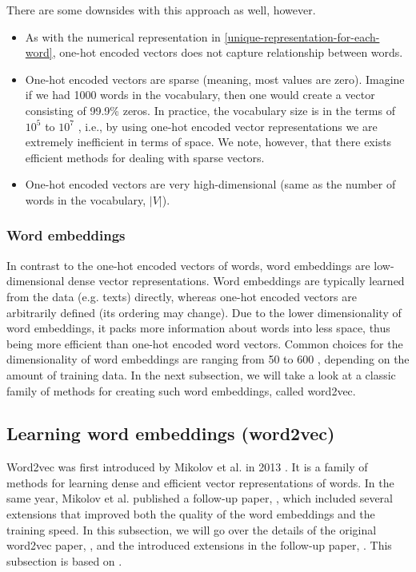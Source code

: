 There are some downsides with this approach as well, however.
\begin{itemize}
    \item As with the numerical representation in \cref{unique-representation-for-each-word}, one-hot encoded vectors does not capture relationship between words.
    \item One-hot encoded vectors are sparse (meaning, most values are zero). Imagine if we had 1000 words in the vocabulary, then one would create a vector consisting of 99.9\% zeros. In practice, the vocabulary size is in the terms of $10^5$ to $10^7$ \cite{mikolov2013b}, i.e., by using one-hot encoded vector representations we are extremely inefficient in terms of space. We note, however, that there exists efficient methods for dealing with sparse vectors.
    \item One-hot encoded vectors are very high-dimensional (same as the number of words in the vocabulary, $|V|$).
\end{itemize}

\subsubsection{Word embeddings}
In contrast to the one-hot encoded vectors of words, word embeddings are low-dimensional dense vector representations. Word embeddings are typically learned from the data (e.g. texts) directly, whereas one-hot encoded vectors are arbitrarily defined (its ordering may change). Due to the lower dimensionality of word embeddings, it packs more information about words into less space, thus being more efficient than one-hot encoded word vectors. Common choices for the dimensionality of word embeddings are ranging from 50 to 600 \cite{mikolov2013a}, depending on the amount of training data. In the next subsection, we will take a look at a classic family of methods for creating such word embeddings, called word2vec.

\subsection{Learning word embeddings (word2vec)}
\label{sec:word2vec}
Word2vec was first introduced by Mikolov et al. in 2013 \cite{mikolov2013a}. It is a family of methods for learning dense and efficient vector representations of words. In the same year, Mikolov et al. published a follow-up paper, \cite{mikolov2013b}, which included several extensions that improved both the quality of the word embeddings and the training speed. In this subsection, we will go over the details of the original word2vec paper, \cite{mikolov2013a}, and the introduced extensions in the follow-up paper, \cite{mikolov2013b}. This subsection is based on \cites{mikolov2013a}{mikolov2013b}.

